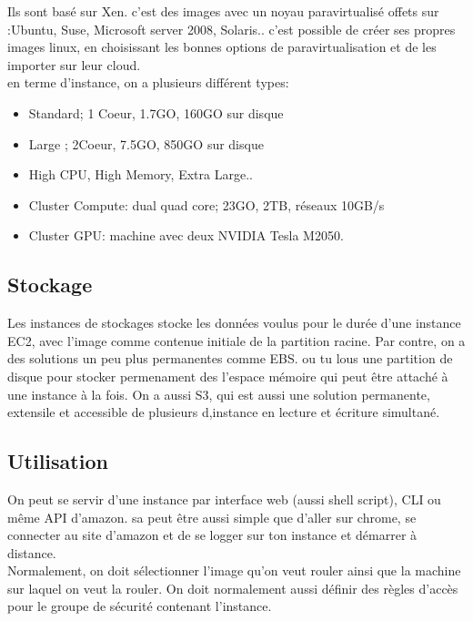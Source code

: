 \documentclass[oneside]{book}
\begin{document}
Ils sont basé sur Xen. c'est des images avec un noyau paravirtualisé offets sur :Ubuntu, Suse, Microsoft server 2008, Solaris.. c'est possible de créer ses propres images linux, en choisissant les bonnes options de paravirtualisation et de les importer sur leur cloud.\\

en terme d'instance, on a plusieurs différent types:
\begin{itemize}
\item Standard; 1 Coeur, 1.7GO, 160GO sur disque
\item Large ; 2Coeur, 7.5GO, 850GO sur disque
\item High CPU, High Memory, Extra Large..
\item Cluster Compute: dual quad core; 23GO, 2TB, réseaux 10GB/s
\item Cluster GPU: machine avec deux NVIDIA Tesla M2050.
\end{itemize}

\subsection{Stockage}
Les instances de stockages stocke les données voulus pour le durée d'une instance EC2, avec l'image comme contenue initiale de la partition racine. Par contre, on a des solutions un peu plus permanentes comme EBS. ou tu lous une partition de disque pour stocker permenament des l'espace mémoire qui peut être attaché à une instance à la fois. On a aussi S3, qui est aussi une solution permanente, extensile et accessible de plusieurs d,instance en lecture et écriture simultané.

\subsection{Utilisation}
On peut se servir d'une instance par interface web (aussi shell script), CLI ou même API d'amazon. sa peut être aussi simple que d'aller sur chrome, se connecter au site d'amazon et de se logger sur ton instance et démarrer à distance.\\

Normalement, on doit sélectionner l'image qu'on veut rouler ainsi que la machine sur laquel on veut la rouler. On doit normalement aussi définir des règles d'accès pour le groupe de sécurité contenant l'instance.\\
\end{document}
